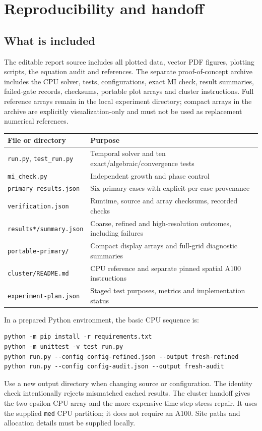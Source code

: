\section{Reproducibility and handoff}\label{sec:repro}
\subsection{What is included}
The editable report source includes all plotted data, vector PDF figures, plotting scripts, the equation audit and references. The separate proof-of-concept archive includes the CPU solver, tests, configurations, exact MI check, result summaries, failed-gate records, checksums, portable plot arrays and cluster instructions. Full reference arrays remain in the local experiment directory; compact arrays in the archive are explicitly visualization-only and must not be used as replacement numerical references.

\begin{center}\small
\begin{tabular}{p{.34\linewidth}p{.57\linewidth}}\toprule
File or directory & Purpose \\\midrule
\texttt{run.py}, \texttt{test\_run.py} & Temporal solver and ten exact/algebraic/convergence tests \\
\texttt{mi\_check.py} & Independent growth and phase control \\
\texttt{primary-results.json} & Six primary cases with explicit per-case provenance \\
\texttt{verification.json} & Runtime, source and array checksums, recorded checks \\
\texttt{results*/summary.json} & Coarse, refined and high-resolution outcomes, including failures \\
\texttt{portable-primary/} & Compact display arrays and full-grid diagnostic summaries \\
\texttt{cluster/README.md} & CPU reference and separate pinned spatial A100 instructions \\
\texttt{experiment-plan.json} & Staged test purposes, metrics and implementation status \\\bottomrule
\end{tabular}
\end{center}
In a prepared Python environment, the basic CPU sequence is:
\begin{verbatim}
python -m pip install -r requirements.txt
python -m unittest -v test_run.py
python run.py --config config-refined.json --output fresh-refined
python run.py --config config-audit.json --output fresh-audit
\end{verbatim}
Use a new output directory when changing source or configuration. The identity check intentionally rejects mismatched cached results. The cluster handoff gives the two-epsilon CPU array and the more expensive time-step stress repair. It uses the supplied \texttt{med} CPU partition; it does not require an A100. Site paths and allocation details must be supplied locally.

